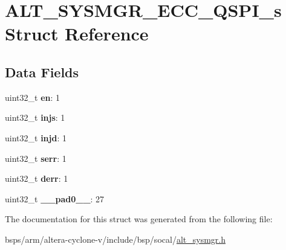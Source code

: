 \hypertarget{structALT__SYSMGR__ECC__QSPI__s}{}\section{A\+L\+T\+\_\+\+S\+Y\+S\+M\+G\+R\+\_\+\+E\+C\+C\+\_\+\+Q\+S\+P\+I\+\_\+s Struct Reference}
\label{structALT__SYSMGR__ECC__QSPI__s}
\subsection*{Data Fields}
\begin{DoxyCompactItemize}
\item 
\mbox{\label{structALT__SYSMGR__ECC__QSPI__s_a9099ac152c382d8c7d834beda0464ae3}} 
uint32\+\_\+t {\bfseries en}\+: 1
\item 
\mbox{\label{structALT__SYSMGR__ECC__QSPI__s_aeaf0f932395ed501b8a5e79f7d9148b0}} 
uint32\+\_\+t {\bfseries injs}\+: 1
\item 
\mbox{\label{structALT__SYSMGR__ECC__QSPI__s_a0d0947d4702216a1cda4b366c81e9143}} 
uint32\+\_\+t {\bfseries injd}\+: 1
\item 
\mbox{\label{structALT__SYSMGR__ECC__QSPI__s_ae1ca75ed2eb8c76e2b27d6be287e8663}} 
uint32\+\_\+t {\bfseries serr}\+: 1
\item 
\mbox{\label{structALT__SYSMGR__ECC__QSPI__s_a573f6649f7586b3fcb8955998696871d}} 
uint32\+\_\+t {\bfseries derr}\+: 1
\item 
\mbox{\label{structALT__SYSMGR__ECC__QSPI__s_a2ef62cd97e146c8117bc31a52c4d6234}} 
uint32\+\_\+t {\bfseries \+\_\+\+\_\+pad0\+\_\+\+\_\+}\+: 27
\end{DoxyCompactItemize}


The documentation for this struct was generated from the following file\+:\begin{DoxyCompactItemize}
\item 
bsps/arm/altera-\/cyclone-\/v/include/bsp/socal/\mbox{\hyperlink{alt__sysmgr_8h}{alt\+\_\+sysmgr.\+h}}\end{DoxyCompactItemize}
